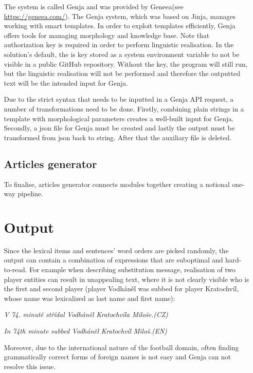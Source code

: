 The system is called Genja and was provided by Geneea(see \url{https://geneea.com/}). The Genja system, which was based on Jinja, manages working with smart templates. In order to exploit templates efficiently, Genja offers tools for managing morphology and knowledge base. Note that authorization key is required in order to perform linguistic realisation. In the solution's default, the is key stored as a system environment variable to not be visible in a public GitHub repository. Without the key, the program will still run, but the linguistic realisation will not be performed and therefore the outputted text will be the intended input for Genja.

Due to the strict syntax that needs to be inputted in a Genja API request, a number of transformations need to be done. Firstly, combining plain strings in a template with morphological parameters creates a well-built input for Genja. Secondly, a json file for Genja must be created and lastly the output must be transformed from json back to string. After that the auxiliary file is deleted.

\subsection{Articles generator}
To finalise, articles generator connects modules together creating a notional one-way pipeline. 

\section{Output}
Since the lexical items and sentences' word orders are picked randomly, the output can contain a combination of expressions that are suboptimal and hard-to-read. For example when describing substitution message, realisation of two player entities can result in unappealing text, where it is not clearly visible who is the first and second player (player Vodháněl was subbed for player Kratochvíl, whose name was lexicalized as last name and first name):
\begin{center}
	\textit{V 74. minutě střídal Vodháněl Kratochvíla Miloše.(CZ)}
\end{center}
\begin{center}
	\textit{In 74th minute subbed Vodháněl Kratochvíl Miloš.(EN)}
\end{center}
Moreover, due to the international nature of the football domain, often finding grammatically correct forms of foreign names is not easy and Genja can not resolve this issue. 

